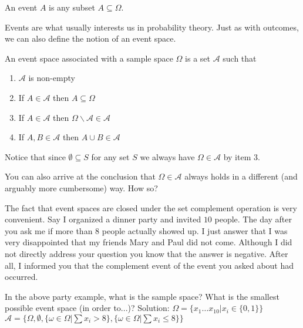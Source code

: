\documentclass[a4paper,11pt,leqno]{report}
\begin{document}
\begin{Definition} 
An event $ A $ is any subset $ A \subseteq \Omega $.
\end{Definition}

Events are what usually interests us in probability theory. Just as with outcomes, we can 
also define the notion of an event space.

\begin{Definition} 
An event space associated with a sample space $ \Omega $ is a set $ \mathcal{A} $ such that
\begin{enumerate}
\item $ \mathcal{A} $ is non-empty
\item If $ A \in \mathcal{A} $ then $ A \subseteq \Omega $
\item If $ A \in \mathcal{A} $ then $ \Omega\backslash \mathcal{A} \in \mathcal{A} $
\item If $ A,B \in \mathcal{A} $ then $ A \cup B \in \mathcal{A} $
\end{enumerate}
\end{Definition}

Notice that since $ \emptyset \subseteq S $ for any set $ S $ we always have $ \Omega \in \mathcal{A} $
by item 3.

\begin{Exercise} 
You can also arrive at the conclusion that $ \Omega \in \mathcal{A} $ always holds in a 
different (and arguably more cumbersome) way. How so?
\end{Exercise}

The fact that event spaces are closed under the set complement operation is very convenient. Say I
organized a dinner party and invited $ 10 $ people. The day after you ask me if more than $ 8 $ people
actually showed up. I just answer that I was very disappointed that my friends Mary and Paul did 
not come. Although I did not directly address your question you know that the answer is negative. After
all, I informed you that the complement event of the event you asked about had occurred.

\begin{Exercise} 
In the above party example, what is the sample space? What is the smallest possible event space (in order to...)?
Solution: $ \Omega = \{x_{1} \ldots x_{10} | x_{i} \in \{0,1\}\} $
$ \mathcal{A} = \{\Omega, \emptyset, \{\omega \in \Omega | \sum x_{i} > 8\},
\{\omega \in \Omega | \sum x_{i} \leq 8\}\} $ 
\end{Exercise}
\end{document}
